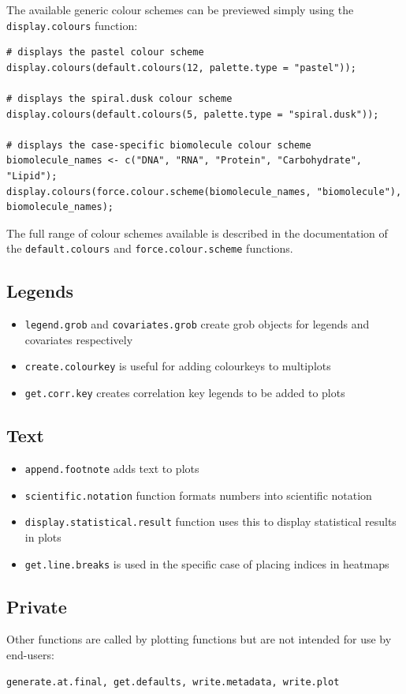 \documentclass[letterpaper]{article}
\begin{document}
The available generic colour schemes can be previewed simply using the \verb|display.colours| function:
\begin{verbatim}
# displays the pastel colour scheme
display.colours(default.colours(12, palette.type = "pastel"));

# displays the spiral.dusk colour scheme
display.colours(default.colours(5, palette.type = "spiral.dusk"));

# displays the case-specific biomolecule colour scheme
biomolecule_names <- c("DNA", "RNA", "Protein", "Carbohydrate", "Lipid");
display.colours(force.colour.scheme(biomolecule_names, "biomolecule"), biomolecule_names);
\end{verbatim}

The full range of colour schemes available is described in the documentation of the \verb|default.colours| and \verb|force.colour.scheme| functions.

\subsection{Legends}
\begin{itemize}
\item \texttt{legend.grob} and \texttt{covariates.grob} create grob objects for legends and covariates respectively
\item \texttt{create.colourkey} is useful for adding colourkeys to multiplots
\item \texttt{get.corr.key} creates correlation key legends to be added to plots
\end{itemize}

\subsection{Text}
\begin{itemize}
\item \texttt{append.footnote} adds text to plots
\item \texttt{scientific.notation} function formats numbers into scientific notation
\item \texttt{display.statistical.result} function uses this to display statistical results in plots
\item \texttt{get.line.breaks} is used in the specific case of placing indices in heatmaps
\end{itemize}

\subsection{Private}
Other functions are called by plotting functions but are not intended for use by end-users: 
\begin{verbatim}
generate.at.final, get.defaults, write.metadata, write.plot
\end{verbatim}
\end{document}
